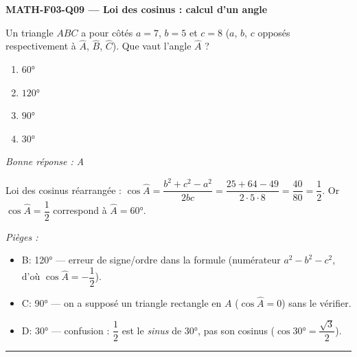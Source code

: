 \documentclass[11pt,a4paper]{article}
\begin{document}
\noindent\textbf{MATH-F03-Q09 --- Loi des cosinus : calcul d'un angle}\par
Un triangle $ABC$ a pour côtés $a=7$, $b=5$ et $c=8$ ($a$, $b$, $c$ opposés respectivement à $\widehat{A}$, $\widehat{B}$, $\widehat{C}$). Que vaut l'angle $\widehat{A}$ ?
\begin{enumerate}[label=\Alph*)]
\item $\ang{60}$
\item $\ang{120}$
\item $\ang{90}$
\item $\ang{30}$
\end{enumerate}
\textit{Bonne réponse : A}\par
Loi des cosinus réarrangée : $\cos\widehat{A}=\dfrac{b^2+c^2-a^2}{2bc}=\dfrac{25+64-49}{2\cdot5\cdot8}=\dfrac{40}{80}=\dfrac12$. Or $\cos\widehat{A}=\dfrac12$ correspond à $\widehat{A}=\ang{60}$.\par
\textit{Pièges :}
\begin{itemize}
\item B: \ang{120} --- erreur de signe/ordre dans la formule (numérateur $a^2-b^2-c^2$, d'où $\cos\widehat{A}=-\dfrac12$).
\item C: \ang{90} --- on a supposé un triangle rectangle en $A$ ($\cos\widehat{A}=0$) sans le vérifier.
\item D: \ang{30} --- confusion : $\dfrac12$ est le \emph{sinus} de \ang{30}, pas son cosinus ($\cos\ang{30}=\dfrac{\sqrt3}{2}$).
\end{itemize}
\vspace{8pt}\hrule\vspace{8pt}
\end{document}
